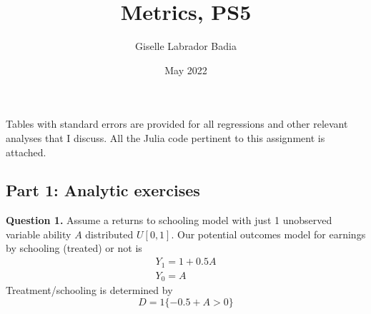 \documentclass{article}
\title{Metrics, PS5}
\author{Giselle Labrador Badia}
\date{May 2022}
\theoremstyle{definition}
\begin{document}
\maketitle

 Tables with standard errors are provided for all regressions and other relevant analyses that I discuss. All the Julia code pertinent to this assignment is attached. 
 
 \subsection*{Part 1: Analytic exercises}
 
 \noindent \hspace{0.41cm} \textbf{Question 1.}  Assume a returns to schooling model with just 1 unobserved variable ability $A$ distributed $U[0,1]$. Our potential outcomes model for earnings by schooling (treated) or not is
$$
\begin{gathered}
Y_{1}=1+0.5 A \\
Y_{0}=A
\end{gathered}
$$
Treatment/schooling is determined by
$$
D=1\{-0.5+A>0\}
$$
 
\end{document}
